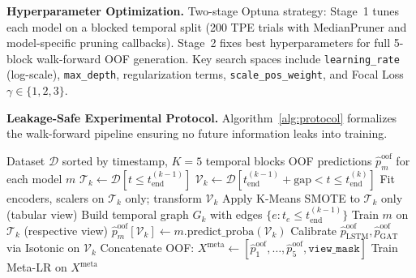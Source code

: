 \documentclass[10pt,a4paper,twocolumn]{article}
\begin{document}
\textbf{Hyperparameter Optimization.} Two-stage Optuna \cite{akiba2019} strategy: Stage~1 tunes each model on a blocked temporal split (200 TPE trials with MedianPruner and model-specific pruning callbacks). Stage~2 fixes best hyperparameters for full 5-block walk-forward OOF generation. Key search spaces include \texttt{learning\_rate} (log-scale), \texttt{max\_depth}, regularization terms, \texttt{scale\_pos\_weight}, and Focal Loss $\gamma \in \{1, 2, 3\}$.

\textbf{Leakage-Safe Experimental Protocol.} Algorithm~\ref{alg:protocol} formalizes the walk-forward pipeline ensuring no future information leaks into training.

\begin{algorithm}[H]
\caption{Leakage-Safe Walk-Forward OOF Protocol}
\label{alg:protocol}
{\small
\begin{algorithmic}[1]
\Require Dataset $\mathcal{D}$ sorted by timestamp, $K{=}5$ temporal blocks
\Ensure OOF predictions $\hat{p}^{\text{oof}}_m$ for each model $m$
    \State $\mathcal{T}_k \gets \mathcal{D}[t \leq t_{\text{end}}^{(k-1)}]$ 
    \State $\mathcal{V}_k \gets \mathcal{D}[t_{\text{end}}^{(k-1)} + \text{gap} < t \leq t_{\text{end}}^{(k)}]$
    \State Fit encoders, scalers on $\mathcal{T}_k$ only; transform $\mathcal{V}_k$
    \State Apply K-Means SMOTE to $\mathcal{T}_k$ only (tabular view)
    \State Build temporal graph $G_k$ with edges $\{e : t_e \leq t_{\text{end}}^{(k-1)}\}$
        \State Train $m$ on $\mathcal{T}_k$ (respective view)
        \State $\hat{p}^{\text{oof}}_m[\mathcal{V}_k] \gets m.\text{predict\_proba}(\mathcal{V}_k)$
    \EndFor
    \State Calibrate $\hat{p}^{\text{oof}}_{\text{LSTM}}, \hat{p}^{\text{oof}}_{\text{GAT}}$ via Isotonic on $\mathcal{V}_k$
\EndFor
\State Concatenate OOF: $X^{\text{meta}} \gets [\hat{p}^{\text{oof}}_1, \ldots, \hat{p}^{\text{oof}}_5, \texttt{view\_mask}]$
\State Train Meta-LR on $X^{\text{meta}}$
\end{algorithmic}
}
\end{algorithm}
\end{document}
